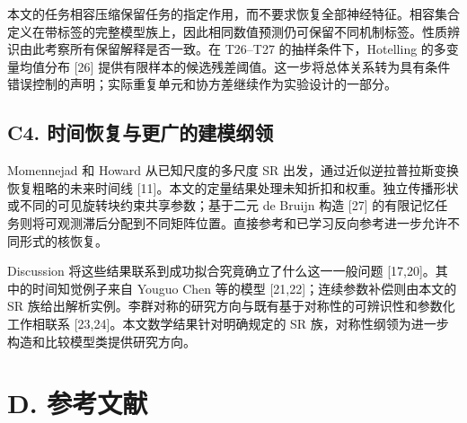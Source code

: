 \documentclass[11pt,a4paper]{article}
\begin{document}
本文的任务相容压缩保留任务的指定作用，而不要求恢复全部神经特征。相容集合定义在带标签的完整模型族上，因此相同数值预测仍可保留不同机制标签。性质辨识由此考察所有保留解释是否一致。在
T26–T27 的抽样条件下，Hotelling 的多变量均值分布 {[}26{]}
提供有限样本的候选残差阈值。这一步将总体关系转为具有条件错误控制的声明；实际重复单元和协方差继续作为实验设计的一部分。

\subsection{C4.
时间恢复与更广的建模纲领}\label{c4.-ux65f6ux95f4ux6062ux590dux4e0eux66f4ux5e7fux7684ux5efaux6a21ux7eb2ux9886}

Momennejad 和 Howard 从已知尺度的多尺度 SR
出发，通过近似逆拉普拉斯变换恢复粗略的未来时间线
{[}11{]}。本文的定量结果处理未知折扣和权重。独立传播形状或不同的可见旋转块约束共享参数；基于二元
de Bruijn 构造 {[}27{]}
的有限记忆任务则将可观测滞后分配到不同矩阵位置。直接参考和已学习反向参考进一步允许不同形式的核恢复。

Discussion 将这些结果联系到成功拟合究竟确立了什么这一一般问题
{[}17,20{]}。其中的时间知觉例子来自 Youguo Chen 等的模型
{[}21,22{]}；连续参数补偿则由本文的 SR
族给出解析实例。李群对称的研究方向与既有基于对称性的可辨识性和参数化工作相联系
{[}23,24{]}。本文数学结果针对明确规定的 SR
族，对称性纲领为进一步构造和比较模型类提供研究方向。

\clearpage

\section{D. 参考文献}\label{d.-ux53c2ux8003ux6587ux732e}

\fontsize{9}{11}\selectfont
\setlength{\parskip}{2pt}
\end{document}
